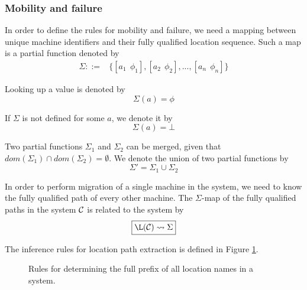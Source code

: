 \newpage

\subsubsection{Mobility and failure}

In order to define the rules for mobility and failure, we need a mapping between
unique machine identifiers and their fully qualified location sequence. Such a
map is a partial function denoted by
\begin{align*}
\Sigma ::={}&
    \{[a_1~~\phi_1], [a_2~~\phi_2], ..., [a_n~~\phi_n]\}
\end{align*}

Looking up a value is denoted by
\begin{equation*}
 \Sigma(a) = \phi
\end{equation*}

If $\Sigma$ is not defined for some $a$, we denote it by
\begin{equation*}
 \Sigma(a) = \bot
\end{equation*}

Two partial functions $\Sigma_1$ and $\Sigma_2$ can be merged, given that
$dom(\Sigma_1) \cap dom(\Sigma_2) = \emptyset$. We denote the union of two
partial functions by
\begin{equation*}
 \Sigma' = \Sigma_1 \cup \Sigma_2
\end{equation*}

In order to perform migration of a single machine in the system, we need to
know the fully qualified path of every other machine. The $\Sigma$-map of the
fully qualified paths in the system $\mathcal{C}$ is related to the system by
\begin{equation*}
\boxed{\L(\C) \leadsto \Sigma}
\end{equation*}

The inference rules for location path extraction is defined in Figure
\ref{fig:rule:makemap}.

\begin{figure}[!h]
\caption{Rules for determining the full prefix of all location names in a
system.}\label{fig:rule:makemap}
\end{figure}

